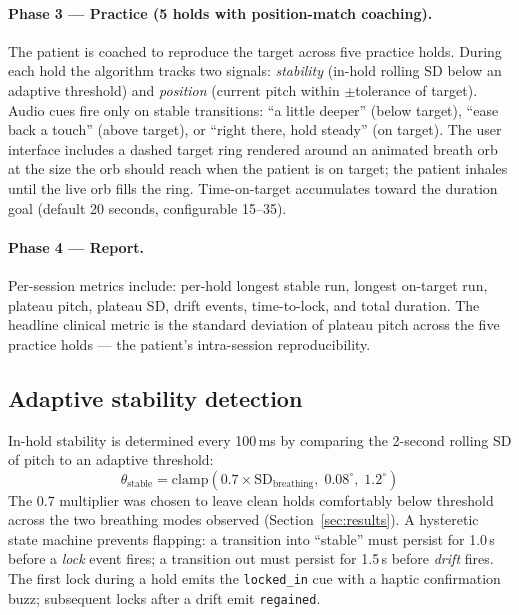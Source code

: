 \documentclass[3p,times]{elsarticle}
\begin{document}
\paragraph{Phase 3 --- Practice (5 holds with position-match coaching).}
The patient is coached to reproduce the target across five
practice holds. During each hold the algorithm tracks two signals:
\emph{stability} (in-hold rolling SD below an adaptive threshold)
and \emph{position} (current pitch within $\pm$tolerance of
target). Audio cues fire only on stable transitions:
``a little deeper'' (below target), ``ease back a touch'' (above
target), or ``right there, hold steady'' (on target). The user
interface includes a dashed target ring rendered around an animated
breath orb at the size the orb should reach when the patient is on
target; the patient inhales until the live orb fills the ring.
Time-on-target accumulates toward the duration goal (default 20
seconds, configurable 15--35).

\paragraph{Phase 4 --- Report.}
Per-session metrics include: per-hold longest stable run, longest
on-target run, plateau pitch, plateau SD, drift events,
time-to-lock, and total duration. The headline clinical metric is
the standard deviation of plateau pitch across the five practice
holds --- the patient's intra-session reproducibility.

\subsection{Adaptive stability detection}

In-hold stability is determined every 100\,ms by comparing the
2-second rolling SD of pitch to an adaptive threshold:
\begin{equation}
\theta_{\text{stable}} = \mathrm{clamp}\!\left(0.7 \times \mathrm{SD}_{\text{breathing}},\; 0.08^{\circ},\; 1.2^{\circ}\right)
\end{equation}
The 0.7 multiplier was chosen to leave clean holds comfortably
below threshold across the two breathing modes observed
(Section~\ref{sec:results}). A hysteretic state machine prevents
flapping: a transition into ``stable'' must persist for 1.0\,s
before a \emph{lock} event fires; a transition out must persist
for 1.5\,s before \emph{drift} fires. The first lock during a hold
emits the \texttt{locked\_in} cue with a haptic confirmation buzz;
subsequent locks after a drift emit \texttt{regained}.
\end{document}
